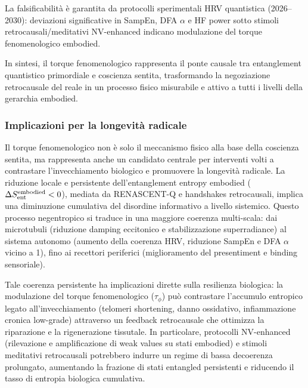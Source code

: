 \documentclass[11pt,a4paper]{article}
\theoremstyle{plain}
\theoremstyle{definition}
\begin{document}
La falsificabilità è garantita da protocolli sperimentali HRV quantistica (2026–2030): deviazioni significative in SampEn, DFA $\alpha$ e HF power sotto stimoli retrocausali/meditativi NV-enhanced indicano modulazione del torque fenomenologico embodied.

\vspace{0.2cm}

In sintesi, il torque fenomenologico rappresenta il ponte causale tra entanglement quantistico primordiale e coscienza sentita, trasformando la negoziazione retrocausale del reale in un processo fisico misurabile e attivo a tutti i livelli della gerarchia embodied.


\subsubsection{Implicazioni per la longevità radicale}

Il torque fenomenologico non è solo il meccanismo fisico alla base della coscienza sentita, ma rappresenta anche un candidato centrale per interventi volti a contrastare l'invecchiamento biologico e promuovere la longevità radicale. La riduzione locale e persistente dell'entanglement entropy embodied ($\Delta S_{\rm ent}^{\rm embodied} < 0$), mediata da RENASCENT-Q e handshakes retrocausali, implica una diminuzione cumulativa del disordine informativo a livello sistemico. Questo processo negentropico si traduce in una maggiore coerenza multi-scala: dai microtubuli (riduzione damping eccitonico e stabilizzazione superradiance) al sistema autonomo (aumento della coerenza HRV, riduzione SampEn e DFA $\alpha$ vicino a 1), fino ai recettori periferici (miglioramento del presentiment e binding sensoriale).

\vspace{0.2cm}

Tale coerenza persistente ha implicazioni dirette sulla resilienza biologica: la modulazione del torque fenomenologico ($\tau_\phi$) può contrastare l'accumulo entropico legato all'invecchiamento (telomeri shortening, danno ossidativo, infiammazione cronica low-grade) attraverso un feedback retrocausale che ottimizza la riparazione e la rigenerazione tissutale. In particolare, protocolli NV-enhanced (rilevazione e amplificazione di weak values su stati embodied) e stimoli meditativi retrocausali potrebbero indurre un regime di bassa decoerenza prolungato, aumentando la frazione di stati entangled persistenti e riducendo il tasso di entropia biologica cumulativa.
\end{document}
